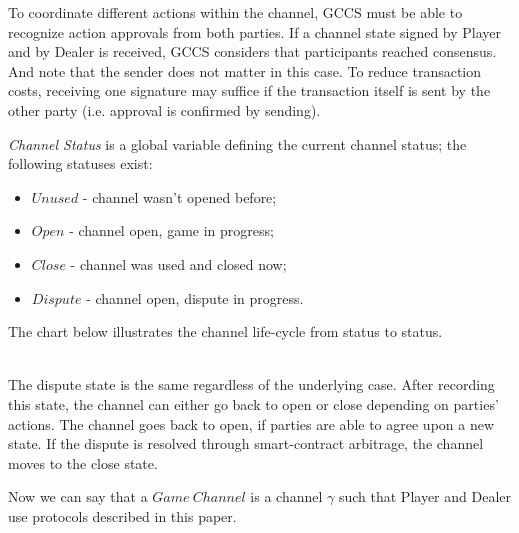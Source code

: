 To coordinate different actions within the channel, GCCS must be able to recognize action approvals from both parties. If a channel state signed by Player and by Dealer is received, GCCS considers that participants reached consensus. And note that the sender does not matter in this case. To reduce transaction costs, receiving one signature may suffice if the transaction itself is sent by the other party (i.e. approval is confirmed by sending).  

\textit {Channel Status} is a global variable defining the current channel status; the following statuses exist:
\begin{itemize}
	\item $Unused$ - channel wasn't opened before;
	\item $Open$ - channel open, game in progress;
	\item $Close$ - channel was used and closed now;
	\item $Dispute$ - channel open, dispute in progress.
\end{itemize}

The chart below illustrates the channel life-cycle from status to status.
\\
\\
\begin{center}
\end{center}

The dispute state is the same regardless of the underlying case. After recording this state, the channel can either go back to open or close depending on parties' actions. The channel goes back to open, if parties are able to agree upon a new state. If the dispute is resolved through smart-contract arbitrage, the channel moves to the close state.

Now we can say that a $ Game \ Channel $ is a channel $\gamma$ such that Player and Dealer use protocols described in this paper. 

